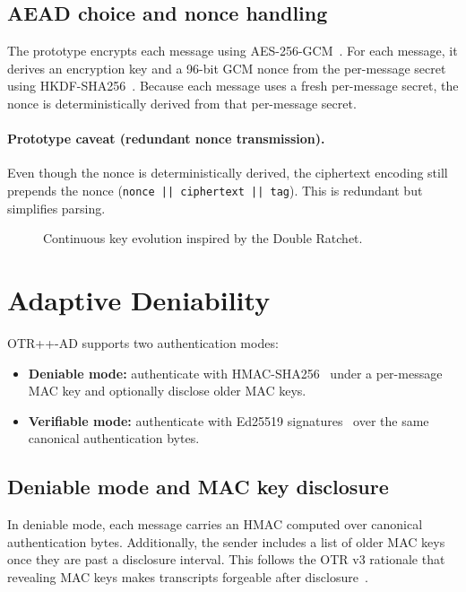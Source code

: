 \documentclass[11pt]{article}
\newcommand{\prot}{OTR++-AD}
\begin{document}
\subsection{AEAD choice and nonce handling}
The prototype encrypts each message using AES-256-GCM~\cite{nist_fips197,nist_sp800_38d}.
For each message, it derives an encryption key and a 96-bit GCM nonce from the per-message secret using HKDF-SHA256~\cite{rfc5869}.
Because each message uses a fresh per-message secret, the nonce is deterministically derived from that per-message secret.

\paragraph{Prototype caveat (redundant nonce transmission).}
Even though the nonce is deterministically derived, the ciphertext encoding still prepends the nonce (\texttt{nonce || ciphertext || tag}).
This is redundant but simplifies parsing.

\begin{figure}[t]
\centering
{}
\caption{Continuous key evolution inspired by the Double Ratchet.}
\label{fig:ratchet}
\end{figure}

\section{Adaptive Deniability}
\prot{} supports two authentication modes:
\begin{itemize}
\item \textbf{Deniable mode:} authenticate with HMAC-SHA256~\cite{rfc2104} under a per-message MAC key and optionally disclose older MAC keys.
\item \textbf{Verifiable mode:} authenticate with Ed25519 signatures~\cite{rfc8032} over the same canonical authentication bytes.
\end{itemize}

\subsection{Deniable mode and MAC key disclosure}
In deniable mode, each message carries an HMAC computed over canonical authentication bytes.
Additionally, the sender includes a list of older MAC keys once they are past a disclosure interval.
This follows the OTR v3 rationale that revealing MAC keys makes transcripts forgeable after disclosure~\cite{otr_v3}.
\end{document}
